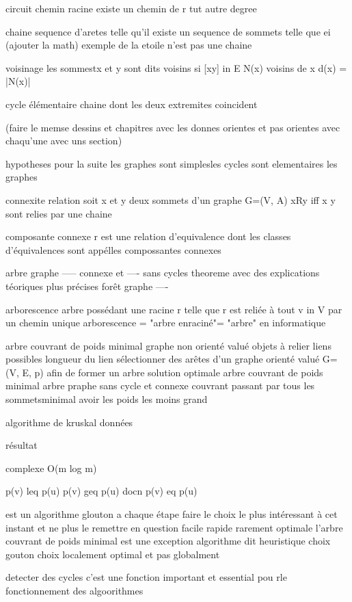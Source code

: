 \documentclass{article}
\begin{document}
circuit
chemin
racine existe un chemin de r  tut autre
degree

chaine sequence d'aretes telle qu'il existe un sequence de sommets telle que ei (ajouter la math)
exemple de la etoile n'est pas une chaine

voisinage les sommestx et y sont dits voisins si [xy] in E
N(x) voisins de x
d(x) = |N(x)|

cycle élémentaire chaine dont les deux extremites coincident

(faire le memse dessins et chapitres avec les donnes orientes et pas orientes avec chaqu'une avec uns section)

hypotheses pour la suite
les graphes sont simplesles cycles sont elementaires
les graphes 

connexite relation soit x et y deux sommets d'un graphe G=(V, A) xRy iff x y sont relies par une chaine

composante connexe r est une relation d'equivalence dont les classes d'équivalences sont appélles compossantes connexes

arbre
graphe ----- connexe et ---- sans cycles
theoreme avec des explications téoriques plus précises
forêt
graphe ----

arborescence
arbre possédant une racine r telle que r est reliée à tout v in V par un chemin unique
arborescence = "arbre enraciné"= "arbre" en informatique

arbre couvrant de poids minimal
    graphe non orienté valué
    objets à relier
    liens possibles
    longueur du lien
sélectionner des arêtes d'un graphe orienté valué G=(V, E, p) afin de former un arbre
solution optimale arbre couvrant de poids minimal
arbre praphe sans cycle et connexe
couvrant passant par tous les sommetsminimal avoir les poids les moins grand


algorithme de kruskal
données

résultat

complexe O(m log m)

p(v) leq p(u)
p(v) geq p(u)
docn p(v) eq p(u)

est un algorithme glouton
    a chaque étape faire le choix le plus intéressant à cet instant et ne plus le remettre en question
        facile 
        rapide
        rarement optimale
            l'arbre couvrant de poids minimal est une exception
            algorithme dit heuristique
        choix gouton choix localement optimal et pas globalment 

    detecter des cycles c'est une fonction important et essential pou rle fonctionnement des algoorithmes
\end{document}
